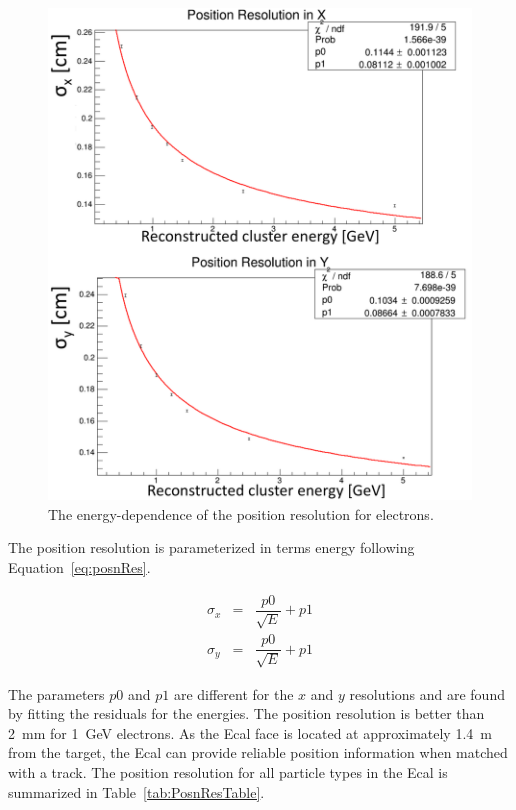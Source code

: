 \documentclass[12pt]{report}
\begin{document}
\begin{figure}[H]
  \centering
      \includegraphics[width=1.0\textwidth]{pics/performance/emPosnResn.png}
  \caption[Energy-dependent position resolution for electrons.]{The energy-dependence of the position resolution for electrons.}
  \label{Figure:emPosnResn}
\end{figure}

The position resolution is parameterized in terms energy following Equation~\eqref{eq:posnRes}.
 
\begin{eqnarray*}
\label{eq:posnRes}
\sigma_x & = & \dfrac{p0}{\sqrt{E}}+p1\\
\sigma_y & = & \dfrac{p0}{\sqrt{E}}+p1
\end{eqnarray*}

The parameters $p0$ and $p1$ are different for the $x$ and $y$ resolutions and are found by fitting the residuals for the energies. The position resolution is better than 2~mm for 1~GeV electrons. As the Ecal face is located at  approximately 1.4~m from the target, the Ecal can provide reliable position information when matched with a track. The position resolution for all particle types in the Ecal is summarized in Table~\ref{tab:PosnResTable}. 
\end{document}
